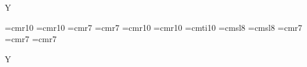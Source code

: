 

\if Y\abcmusix%

\else%




\fi


\vsize=10.5in
\hsize=7.5cm

\raggedbottom
\nopagenumbers



\font\Xfont=cmr10
\font\Tfont=cmr10
\font\Tafont=cmr7  %
\font\Tbfont=cmr7  %
\font\Tifont=cmr10 %
\font\Wfont=cmr10
\font\Sfont=cmti10
\font\Cfont=cmsl8
\font\Afont=cmsl8
\font\Nfont=cmr7
\font\Pfont=cmr7
\font\gfont=cmr7   %


\if Y\abcmusix%
\smallmusicsize
\nobarnumbers
\else%
\relax
\def\freqbarno{99}
\fi
\def\stdafterruleskip{2\Internote}
\parindent 0pt

\let\tune=\vbox




\def\header{%
\hbox to\hsize{\hfil\Tfont \Xstring.\ \Tstring\ %
\if Y\Strue{\Sfont(\Sstring)}\ \fi%
\hfil%
\if Y\Ctrue{\Cfont\Cstring}\ \fi%
\if Y\Atrue{\Afont(\Astring)}\fi%
}\nobreak%
\if Y\Ntrue{\centerline{\Nfont \Nstring}\nobreak}\fi%
\if Y\Tatrue{\centerline{\Tafont AKA \Tastring}\nobreak}\fi%
\if Y\Tbtrue{\Tbfont AKA \Tbstring}\fi%
\if Y\Ptrue{\line{\Pfont Play \Pstring\hfil}\nobreak}\fi%
}

